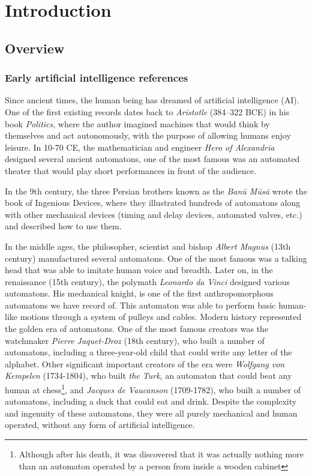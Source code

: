 \chapter{Introduction} \label{ch:introduction}
\section{Overview}
\subsection{Early artificial intelligence references}
Since ancient times, the human being has dreamed of artificial intelligence (AI). One of the first existing records dates back to \textit{Aristotle} (384–322 BCE) in his book \textit{Politics}, where the author imagined machines that would think by themselves and act autonomously, with the purpose of allowing humans enjoy leisure. In 10-70 CE, the mathematician and engineer \textit{Hero of Alexandria} designed several ancient automatons, one of the most famous was an automated theater that would play short performances in front of the audience.

In the 9th century, the three Persian brothers known as the \textit{Banū Mūsā} wrote the book of Ingenious Devices, where they illustrated hundreds of automatons along with other mechanical devices (timing and delay devices, automated valves, etc.) and described how to use them.

In the middle ages, the philosopher, scientist and bishop \textit{Albert Magnus} (13th century) manufactured several automatons. One of the most famous was a talking head that was able to imitate human voice and breadth. Later on, in the renaissance (15th century), the polymath \textit{Leonardo da Vinci} designed various automatons. His mechanical knight, is one of the first anthropomorphous automatons we have record of. This automaton was able to perform basic human-like motions through a system of pulleys and cables. Modern history represented the golden era of automatons. One of the most famous creators was the watchmaker \textit{Pierre Jaquet-Droz} (18th century), who built a number of automatons, including a three-year-old child that could write any letter of the alphabet. Other significant important creators of the era were \textit{Wolfgang von Kempelen} (1734-1804), who built \textit{the Turk}, an automaton that could beat any human at chess\footnote{Although after his death, it was discovered that it was actually nothing more than an automaton operated by a person from inside a wooden cabinet }, and \textit{Jacques de Vaucanson} (1709-1782), who built a number of automatons, including a duck that could eat and drink. Despite the complexity and ingenuity of these automatons, they were all purely mechanical and human operated, without any form of artificial intelligence.

